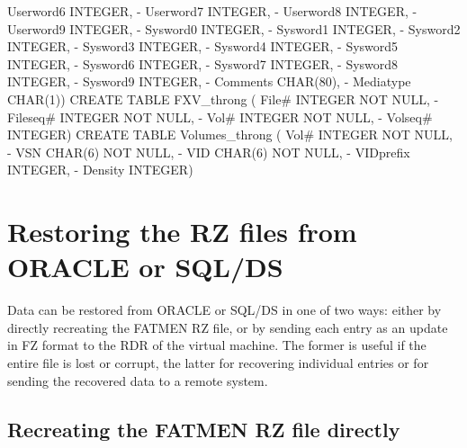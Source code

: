 \begin{Fighere}
\begin{minipage}[t]{.498\linewidth}
\begin{XMP}
                              Userword6 INTEGER,         -
                              Userword7 INTEGER,         -
                              Userword8 INTEGER,         -
                              Userword9 INTEGER,         -
                              Sysword0 INTEGER,          -
                              Sysword1 INTEGER,          -
                              Sysword2 INTEGER,          -
                              Sysword3 INTEGER,          -
                              Sysword4 INTEGER,          -
                              Sysword5 INTEGER,          -
                              Sysword6 INTEGER,          -
                              Sysword7 INTEGER,          -
                              Sysword8 INTEGER,          -
                              Sysword9 INTEGER,          -
                              Comments CHAR(80),         -
                              Mediatype CHAR(1))
CREATE TABLE FXV_throng ( File# INTEGER NOT NULL,        -
                          Fileseq# INTEGER NOT NULL,     -
                          Vol# INTEGER NOT NULL,         -
                          Volseq# INTEGER)
CREATE TABLE Volumes_throng ( Vol# INTEGER NOT NULL,     -
                              VSN CHAR(6) NOT NULL,      -
                              VID CHAR(6) NOT NULL,      -
                              VIDprefix INTEGER,         -
                              Density INTEGER)
\end{XMP}
\end{minipage}
\end{Fighere}

\chapter{Restoring the RZ files from ORACLE or SQL/DS}

Data can be restored from ORACLE or SQL/DS in one of two ways: either by
directly recreating the FATMEN RZ file, or by sending each entry
as an update in FZ format to the RDR of the virtual machine.
The former is useful if the entire file is lost or corrupt, the
latter for recovering individual entries or for sending the
recovered data to a remote system.

\section{Recreating the FATMEN RZ file directly}

